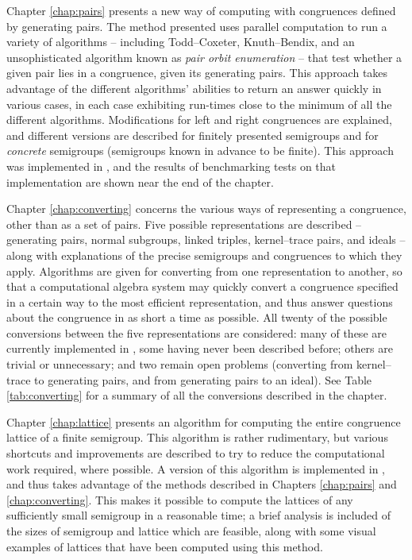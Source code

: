 Chapter \ref{chap:pairs} presents a new way of computing with congruences
defined by generating pairs.  The method presented uses parallel computation to
run a variety of algorithms -- including Todd--Coxeter, Knuth--Bendix, and an
unsophisticated algorithm known as \textit{pair orbit enumeration} -- that test
whether a given pair lies in a congruence, given its generating pairs.  This
approach takes advantage of the different algorithms' abilities to return an
answer quickly in various cases, in each case exhibiting run-times close to the
minimum of all the different algorithms.  Modifications for left and right
congruences are explained, and different versions are described for finitely
presented semigroups and for \textit{concrete} semigroups (semigroups known in
advance to be finite).  This approach was implemented in
\libsemigroups{} \cite{libsemigroups}, and the results of benchmarking tests on
that implementation are shown near the end of the chapter.

Chapter \ref{chap:converting} concerns the various ways of representing a
congruence, other than as a set of pairs.  Five possible representations are
described -- generating pairs, normal subgroups, linked triples, kernel--trace
pairs, and ideals -- along with explanations of the precise semigroups and
congruences to which they apply.  Algorithms are given for converting from one
representation to another, so that a computational algebra system may quickly
convert a congruence specified in a certain way to the most efficient
representation, and thus answer questions about the congruence in as short a
time as possible.  All twenty of the possible conversions between the five
representations are considered: many of these are currently implemented in
\Semigroups{} \cite{semigroups}, some having never been described before; others
are trivial or unnecessary; and two remain open problems (converting from
kernel--trace to generating pairs, and from generating pairs to an ideal).  See
Table \ref{tab:converting} for a summary of all the conversions described in the
chapter.

Chapter \ref{chap:lattice} presents an algorithm for computing the entire
congruence lattice of a finite semigroup.  This algorithm is rather rudimentary,
but various shortcuts and improvements are described to try to reduce the
computational work required, where possible.  A version of this algorithm is
implemented in \Semigroups{}, and thus takes advantage of the methods described
in Chapters \ref{chap:pairs} and \ref{chap:converting}.  This makes it possible
to compute the lattices of any sufficiently small semigroup in a reasonable
time; a brief analysis is included of the sizes of semigroup and lattice which
are feasible, along with some visual examples of lattices that have been
computed using this method.

